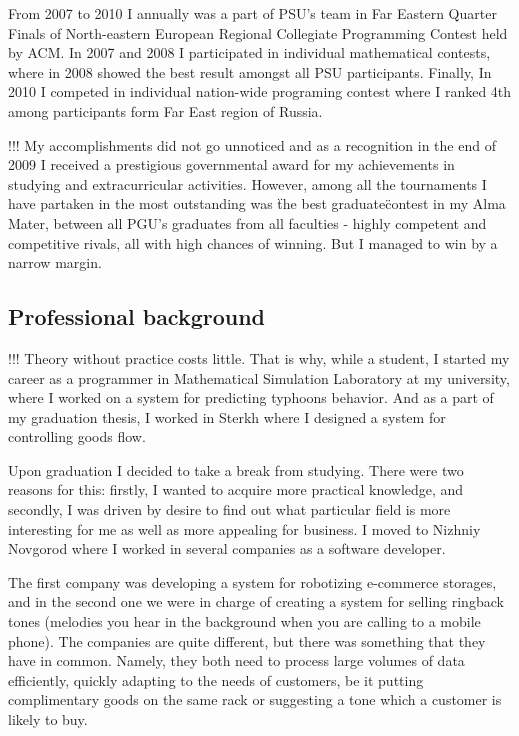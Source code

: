 \documentclass[a4paper,14pt]{extarticle}
\begin{document}
From 2007 to 2010 I annually was a part of PSU's team in Far Eastern Quarter Finals of North-eastern European Regional Collegiate Programming Contest held by ACM. In 2007 and 2008 I participated in individual mathematical contests, where in 2008 showed the best result amongst all PSU participants. Finally, In 2010 I competed in individual nation-wide programing contest where I ranked 4th among participants form Far East region of Russia.

!!!
My accomplishments did not go unnoticed and as a recognition in the end of 2009 I received a prestigious governmental award for my achievements in studying and extracurricular activities. However, among all the tournaments I have partaken in the most outstanding was \"the best graduate\" contest in my Alma Mater, between all PGU's graduates from all faculties - highly competent and competitive rivals, all with high chances of winning. But I managed to win by a narrow margin.


\subsection*{Professional background}

!!! 
Theory without practice costs little. That is why, while a student, I started my career as a programmer in Mathematical Simulation Laboratory at my university, where I worked on a system for predicting typhoons behavior. And as a part of my graduation thesis, I worked in Sterkh where I designed a system for controlling goods flow.

Upon graduation I decided to take a break from studying. There were two reasons for this: firstly, I wanted to acquire more practical knowledge, and secondly, I was driven by desire to find out what particular field is more interesting for me as well as more appealing for business. I moved to Nizhniy Novgorod where I worked in several companies as a software developer.

The first company was developing a system for robotizing e-commerce storages, and in the second one we were in charge of creating a system for selling ringback tones (melodies you hear in the background when you are calling to a mobile phone). The companies are quite different, but there was something that they have in common. Namely, they both need to process large volumes of data efficiently, quickly adapting to the needs of customers, be it putting complimentary goods on the same rack or suggesting a tone which a customer is likely to buy. 
\end{document}
